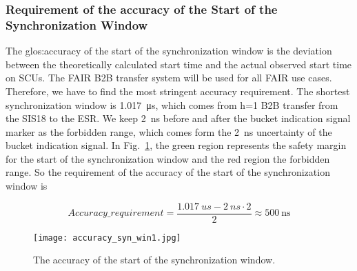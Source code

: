 \subsubsection{Requirement of the accuracy of the Start of the Synchronization Window}
\label{cal_accuracy}
The \gls{glos:accuracy} of the start of the synchronization window is the deviation between the theoretically calculated start time and the actual observed start time on SCUs. The FAIR B2B transfer system will be used for all FAIR use cases. Therefore, we have to find the most stringent accuracy requirement. The shortest synchronization window is \SI{1.017}{\us}, which comes from h=1 B2B transfer from the SIS18 to the ESR. We keep \SI{2}{ns} before and after the bucket indication signal marker as the forbidden range, which comes form the \SI{2}{ns} uncertainty of the bucket indication signal. In Fig.~\ref{accuracy_syn_win1}, the green region represents the safety margin for the start of the synchronization window and the red region the forbidden range. So the requirement of the accuracy of the start of the synchronization window is 

\begin{equation}
Accuracy\_requirement=\frac{\SI{1.017}{us}-\SI{2}{ns} \cdot 2}{2} \approx  \SI{500}{\ns}\label{accu}
\end{equation}

\begin{figure}[!htb]
   \centering   
   \texttt{[image: accuracy\_syn\_win1.jpg]}
   \caption{The accuracy of the start of the synchronization window.}
   \label{accuracy_syn_win1}
\end{figure}





